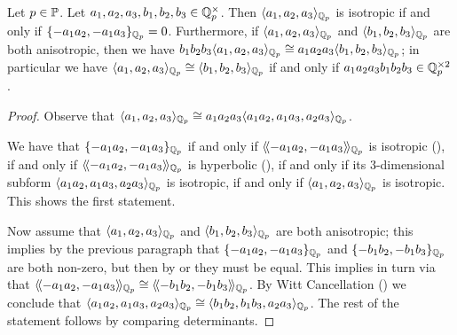 \documentclass[12pt, leqno, british]{amsart}
\begin{document}
\begin{prop}\label{P:classify-3-dimensional-qqp}
Let $p \in \mathbb P$.
Let $a_1, a_2, a_3, b_1, b_2, b_3 \in \mathbb Q_p^\times$.
Then $\langle a_1, a_2, a_3 \rangle_{\mathbb Q_p}$ is isotropic if and only if $\lbrace -a_1a_2, -a_1a_3 \rbrace_{\mathbb Q_p} = 0$.
Furthermore, if $\langle a_1, a_2, a_3 \rangle_{\mathbb Q_p}$ and $\langle b_1, b_2, b_3 \rangle_{\mathbb Q_p}$ are both anisotropic, then we have $b_1b_2b_3\langle a_1, a_2, a_3 \rangle_{\mathbb Q_p} \cong a_1a_2a_3\langle b_1, b_2, b_3 \rangle_{\mathbb Q_p}$; in particular we have $\langle a_1, a_2, a_3 \rangle_{\mathbb Q_p} \cong \langle b_1, b_2, b_3 \rangle_{\mathbb Q_{p}}$ if and only if $a_1a_2a_3b_1b_2b_3 \in \mathbb Q_p^{\times 2}$.
\end{prop}
\begin{proof}
Observe that $\langle a_1, a_2, a_3 \rangle_{\mathbb Q_p} \cong a_1a_2a_3\langle a_1a_2, a_1a_3, a_2a_3\rangle_{\mathbb Q_p}$.

We have that $\lbrace -a_1a_2, -a_1a_3 \rbrace_{\mathbb Q_p}$ if and only if $\langle\!\langle -a_1a_2, -a_1a_3 \rangle\!\rangle_{\mathbb Q_p}$ is isotropic (), if and only if $\langle\!\langle -a_1a_2, -a_1a_3 \rangle\!\rangle_{\mathbb Q_p}$ is hyperbolic (), if and only if its $3$-dimensional subform $\langle a_1a_2, a_1a_3, a_2a_3 \rangle_{\mathbb Q_p}$ is isotropic, if and only if $\langle a_1, a_2, a_3 \rangle_{\mathbb Q_p}$ is isotropic.
This shows the first statement.

Now assume that $\langle a_1, a_2, a_3 \rangle_{\mathbb Q_p}$ and $\langle b_1, b_2, b_3 \rangle_{\mathbb Q_p}$ are both anisotropic; this implies by the previous paragraph that $\lbrace -a_1a_2, -a_1a_3 \rbrace_{\mathbb Q_p}$ and $\lbrace -b_1b_2, -b_1b_3 \rbrace_{\mathbb Q_p}$ are both non-zero, but then by  or  they must be equal.
This implies in turn via  that $\langle\!\langle -a_1a_2, -a_1a_3 \rangle\!\rangle_{\mathbb Q_p} \cong \langle\!\langle -b_1b_2, -b_1b_3 \rangle\!\rangle_{\mathbb Q_p}$.
By Witt Cancellation () we conclude that $\langle a_1a_2, a_1a_3, a_2a_3\rangle_{\mathbb Q_p} \cong \langle b_1b_2, b_1b_3, a_2a_3\rangle_{\mathbb Q_p}$.
The rest of the statement follows by comparing determinants.
\end{proof}
\end{document}
